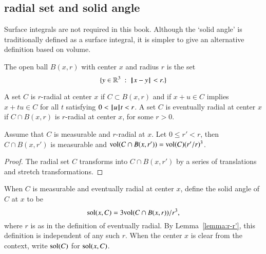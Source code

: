 \subsection{radial set and solid angle}\label{sec:solid}

Surface integrals are not required in this book.  Although
the `solid angle' is traditionally defined as a surface integral,
it is simpler to give an alternative definition based on volume.


\begin{definition}  The open ball $B(x,r)$ with center $x$ and
radius $r$ is the set
    $$
    \{ y\in\mathbb{R}^3 \ :\  {\hskip0.1em|\hskip-0.15em|\hskip0.1em}x - y{\hskip0.1em|\hskip-0.15em|\hskip0.1em} < r.\}
    $$
\end{definition}



\begin{definition}[radial]
    A set $C$ is $r$-radial at center $x$ if  $C\subset B(x,r)$
    and if
        $x + u \in C$ implies
        $x + t u \in C$ for all $t$ satisfying $0 < {{\hskip0.1em|\hskip-0.15em|\hskip0.1em}u{\hskip0.1em|\hskip-0.15em|\hskip0.1em}} t < r$.
A set $C$ is eventually radial at center $x$ if $C\cap B(x,r)$ is
$r$-radial at center $x$, for some $r>0$.
\end{definition}

\begin{lemma}
Assume that $C$ is measurable and $r$-radial at $x$.  Let $0\le r'<r$,
then $C\cap B(x,r')$ is measurable and
${\operatorname{vol}}(C\cap B(x,r')) = {\operatorname{vol}}(C) (r'/r)^3$.
\end{lemma}

\begin{proof}  The radial set $C$ transforms into $C\cap B(x,r')$ by
a series of translations and stretch transformations.
\end{proof}


\begin{definition}
When $C$ is measurable and eventually radial at center $x$, 
define the solid angle of $C$ at $x$ to be
    $$
    {\operatorname{sol}}(x,C) = 3 {\operatorname{vol}}(C\cap B(x,r))/r^3,
    $$
where $r$ is as in the definition of eventually radial. 
By Lemma~\ref{lemma:r-r'}, this
definition is independent of any such $r$.  When the center $x$ is
clear from the context, write ${\operatorname{sol}}(C)$ for
${\operatorname{sol}}(x,C)$.
\end{definition}



